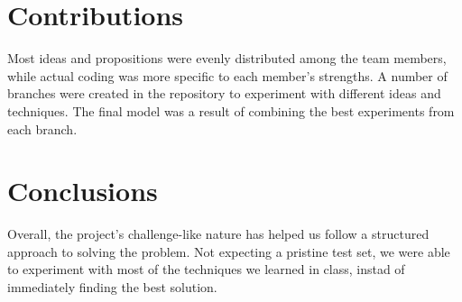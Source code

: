 \documentclass[11pt]{article}
\begin{document}
\begin{multicols}{2}
      \section{Contributions}

      Most ideas and propositions were evenly distributed among the team
      members, while actual coding was more specific to each member's
      strengths. A number of branches were created in the repository to
      experiment with different ideas and techniques. The final model was a
      result of combining the best experiments from each branch.

      \section{Conclusions}

      Overall, the project's challenge-like nature has helped us follow a
      structured approach to solving the problem. Not expecting a pristine test
      set, we were able to experiment with most of the techniques we learned in
      class, instad of immediately finding the best solution.

      
      

\end{multicols}
\end{document}
